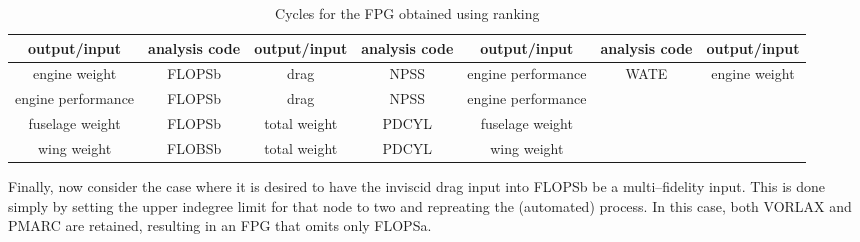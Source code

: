 \begin{table}[htbp]
  \centering
  \caption{Cycles for the FPG obtained using ranking}
    \begin{tabular}{ccccccc}
    \toprule
    output/input & analysis code & output/input & analysis code & output/input & analysis code & output/input \\
    \midrule
    engine weight & FLOPSb & drag  & NPSS  & engine performance & WATE  & engine weight \\
    engine performance & FLOPSb & drag  & NPSS  & engine performance &       &  \\
    fuselage weight & FLOPSb & total weight & PDCYL & fuselage weight &       &  \\
    wing weight & FLOBSb & total weight & PDCYL & wing weight &       &  \\
    \bottomrule
    \end{tabular}%
  \label{t:cycles}
\end{table}%

Finally, now consider the case where it is desired to have the inviscid drag input into FLOPSb be a multi--fidelity input. This is done simply by setting the upper indegree limit for that node to two and repreating the (automated) process. In this case, both VORLAX and PMARC are retained, resulting in an FPG that omits only FLOPSa.








